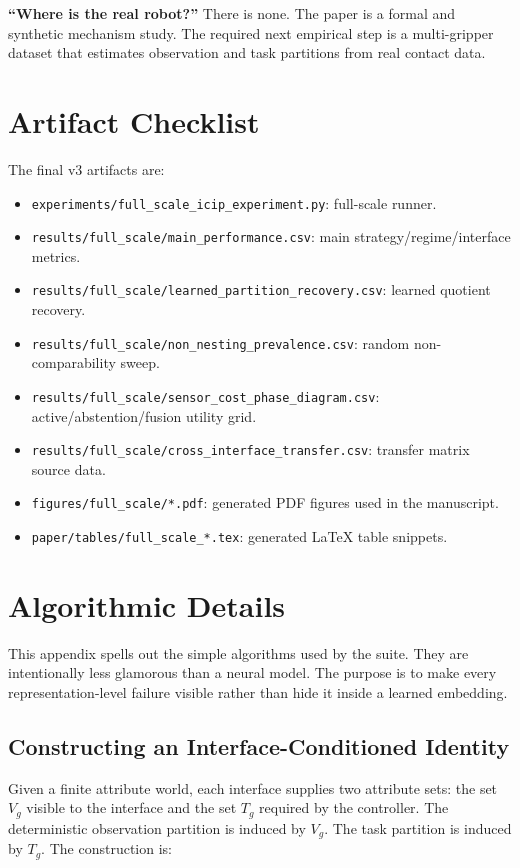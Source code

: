 \documentclass{article}
\begin{document}
\textbf{``Where is the real robot?''}
There is none.
The paper is a formal and synthetic mechanism study.
The required next empirical step is a multi-gripper dataset that estimates observation and task partitions from real contact data.

\section{Artifact Checklist}

The final v3 artifacts are:
\begin{itemize}
    \item \texttt{experiments/full\_scale\_icip\_experiment.py}: full-scale runner.
    \item \texttt{results/full\_scale/main\_performance.csv}: main strategy/regime/interface metrics.
    \item \texttt{results/full\_scale/learned\_partition\_recovery.csv}: learned quotient recovery.
    \item \texttt{results/full\_scale/non\_nesting\_prevalence.csv}: random non-comparability sweep.
    \item \texttt{results/full\_scale/sensor\_cost\_phase\_diagram.csv}: active/abstention/fusion utility grid.
    \item \texttt{results/full\_scale/cross\_interface\_transfer.csv}: transfer matrix source data.
    \item \texttt{figures/full\_scale/*.pdf}: generated PDF figures used in the manuscript.
    \item \texttt{paper/tables/full\_scale\_*.tex}: generated LaTeX table snippets.
\end{itemize}

\section{Algorithmic Details}

This appendix spells out the simple algorithms used by the suite.
They are intentionally less glamorous than a neural model.
The purpose is to make every representation-level failure visible rather than hide it inside a learned embedding.

\subsection{Constructing an Interface-Conditioned Identity}

Given a finite attribute world, each interface supplies two attribute sets: the set $V_g$ visible to the interface and the set $T_g$ required by the controller.
The deterministic observation partition is induced by $V_g$.
The task partition is induced by $T_g$.
The construction is:
\end{document}
